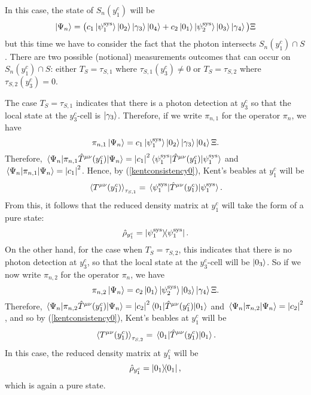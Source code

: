 In this case, the state of $S_n(y^c_1)$ will be
 \begin{equation*}
 \ket{\Psi_n}=\big(c_1\ket{\psi_1^\text{sys}}\ket{0_2}\ket{\gamma_3}\ket{0_4}+c_2\ket{0_1}\ket{\psi_2^\text{sys}}\ket{0_3}\ket{\gamma_4}\big)\Xi
 \end{equation*}
 but this time we have to consider the fact that the photon intersects $S_n(y^c_1)\cap S$. There are two possible (notional) measurements outcomes that can occur on $S_n(y^c_1)\cap S$: either $T_S=\tau_{S,1}$ where $\tau_{S,1}(y^c_3)\neq 0$ or $T_S=\tau_{S,2}$ where $\tau_{S,2}(y^c_3)=0.$ 
 
 The case  $T_S=\tau_{S,1}$ indicates that there is a photon detection at $y^c_3$ so that the local state at the $y^c_3$-cell is $\ket{\gamma_3}$. Therefore, if we write $\pi_{n,1}$ for the operator $\pi_n$, we have 
 $$\pi_{n,1}\ket{\Psi_n}=c_1\ket{\psi_1^\text{sys}}\ket{0_2}\ket{\gamma_3}\ket{0_4}\Xi.$$
 Therefore, 
 $\ev*{\pi_{n,1}\hat{T}^{\mu\nu}(y^c_1)}{\Psi_n}=\abs{c_1}^2\ev*{\hat{T}^{\mu\nu}(y^c_1)}{\psi_1^\text{sys}}$ and  $\ev*{\pi_{n,1}}{\Psi_n}=\abs{c_1}^2$. Hence, by (\ref{kentconsistency0}), Kent's beables at $y^c_1$ will be 
 $$\ev*{T^{\mu\nu}(y^c_1)}_{\tau_{S,1}}=\ev*{\hat{T}^{\mu\nu}(y^c_1)}{\psi_1^\text{sys}}.$$ 
 From this, it follows that the reduced density matrix at $y^c_1$ will take the form of a pure state:
 \begin{equation}
\hat{\rho}_{y^c_1}= \dyad{\psi_1^\text{sys}}.
\end{equation} 
 On the other hand, for the case when  $T_S=\tau_{S,2}$, this indicates that there is no photon detection at $y^c_3$, so that the local state at the $y^c_3$-cell will be $\ket{0_3}$. So if we now  write $\pi_{n,2}$ for the operator $\pi_n$, we have 
 $$\pi_{n,2}\ket{\Psi_n}=c_2\ket{0_1}\ket{\psi_2^\text{sys}}\ket{0_3}\ket{\gamma_4}\Xi.$$
 Therefore, 
 $\ev*{\pi_{n,2}\hat{T}^{\mu\nu}(y^c_1)}{\Psi_n}=\abs{c_2}^2\ev*{\hat{T}^{\mu\nu}(y^c_1)}{0_1}$ and  $\ev*{\pi_{n,2}}{\Psi_n}=\abs{c_2}^2$,  
  and so by (\ref{kentconsistency0}), Kent's beables at $y^c_1$ will be 
 $$\ev*{T^{\mu\nu}(y^c_1)}_{\tau_{S,2}}=\ev*{\hat{T}^{\mu\nu}(y^c_1)}{0_1}.$$
 In this case, the reduced density matrix at $y^c_1$  will be
  \begin{equation}
\hat{\rho}_{y^c_1}= \dyad{0_1},
\end{equation} 
which is again a pure state.

